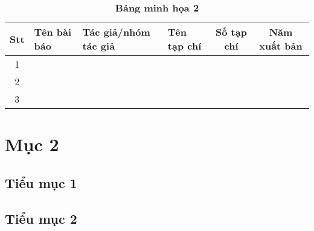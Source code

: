 \begin{table}[ht]
 \caption{\textbf{Bảng minh họa 2}}
 \centering
\begin{tabular}{|c|l|l|l|c|c|}
		\hline
		\textbf{Stt} &\textbf{Tên bài báo} & \textbf{Tác giả/nhóm tác giả}
		& \textbf{Tên tạp chí} &\textbf{Số tạp chí} & \textbf{Năm xuất bản}
		\\
		\hline
		1 &   &  & &  & \\
		\hline
	2 &   &  & &  & \\
		\hline
        3 &   &  & &  & \\
		\hline
	\end{tabular}
    \end{table}
\section{Mục 2}
\subsection{Tiểu mục 1}

\subsection{Tiểu mục 2}



